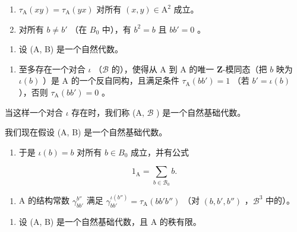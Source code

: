 \begin{enumerate}
\def\labelenumi{\alph{enumi})}
\item
  \(\tau_{\mathrm{A}}(xy) = \tau_{\mathrm{A}}(yx)\) 对所有 \((x,y)\in \mathrm{A}^2\) 成立。
\item
  对所有 \(b \neq b'\) （在 \(B_{0}\) 中），有 \(b^2 = b\) 且 \(bb' = 0\) 。
\end{enumerate}

\begin{enumerate}
\def\labelenumi{\arabic{enumi})}
\setcounter{enumi}{6}
\tightlist
\item
  设 (A, B) 是一个自然代数。
\end{enumerate}

\begin{enumerate}
\def\labelenumi{\alph{enumi})}
\tightlist
\item
  至多存在一个对合 \(\iota\) （\(\mathcal{B}\) 的），使得从 A 到 A 的唯一 \(\mathbf{Z}\)-模同态（把 \(b\) 映为 \(\iota(b)\) ）是 A 的一个反自同构，且满足条件 \(\tau_{\mathrm{A}}(bb') = 1\) （若 \(b' = \iota(b)\) ），否则 \(\tau_{\mathrm{A}}(bb') = 0\) 。
\end{enumerate}

当这样一个对合 \(\iota\) 存在时，我们称 (A, \(\mathcal{B}\) ) 是一个自然基础代数。

我们现在假设 (A, B) 是一个自然基础代数。

\begin{enumerate}
\def\labelenumi{\alph{enumi})}
\setcounter{enumi}{1}
\tightlist
\item
  于是 \(\iota(b) = b\) 对所有 \(b \in B_{0}\) 成立，并有公式
\end{enumerate}

\[
1 _ {\mathrm{A}} = \sum_ {b \in \mathcal {B} _ {0}} b.
\]

\begin{enumerate}
\def\labelenumi{\alph{enumi})}
\setcounter{enumi}{2}
\tightlist
\item
  A 的结构常数 \(\gamma_{bb'}^{b''}\) 满足 \(\gamma_{bb'}^{\iota(b'')} = \tau_{\mathrm{A}}(bb'b'')\) （对 \((b, b', b'')\) ，\(\mathcal{B}^{3}\) 中的）。
\end{enumerate}

\begin{enumerate}
\def\labelenumi{\arabic{enumi})}
\setcounter{enumi}{7}
\tightlist
\item
  设 (A, B) 是一个自然基础代数，且 A 的秩有限。
\end{enumerate}

